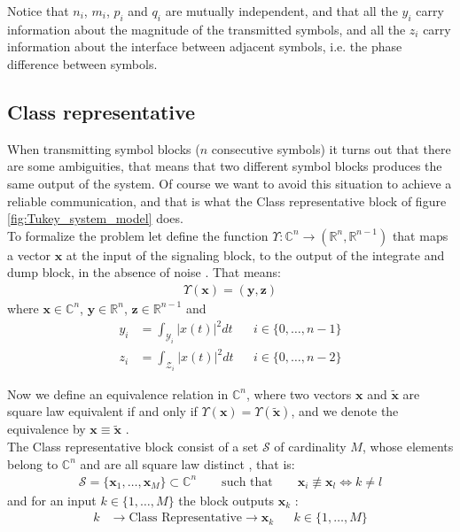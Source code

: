 Notice that $n_i$, $m_i$, $p_i$ and $q_i$ are mutually  independent, and that all the $y_i$ carry information about the magnitude of the transmitted symbols, and all the $z_i$ carry information about the interface between adjacent symbols, i.e. the phase difference between symbols.

\subsection{Class representative}

When transmitting symbol blocks ($n$ consecutive symbols) it turns out that there are some ambiguities, that means that two different symbol blocks produces the same output of the system. Of course we want to avoid this situation to achieve a reliable communication, and that is what the Class representative block of figure \ref{fig:Tukey_system_model} does.\\

To formalize the problem let define the function $\Upsilon: \mathds{C}^n\to(\mathds{R}^n,\mathds{R}^{n-1})$ that maps a vector $\bm x$ at the input of the signaling block, to the output of the integrate and dump block, in the absence of noise \cite{Tasbihi_Tukey}. That means:
\begin{align}
	\Upsilon(\bm x) = (\bm y, \bm z)
\end{align}
where $\bm x\in\mathds{C}^n$, $\bm y\in\mathds{R}^n$, $\bm z\in\mathds{R}^{n-1}$ and 
\begin{align}
	y_i&=\int_{\mathcal Y_i}\bigl|x(t)\bigr|^2dt&&i\in \{0,\dotsc,n-1\}\\
	z_i&=\int_{\mathcal Z_i}\bigl|x(t)\bigr|^2dt&&i\in \{0,\dotsc,n-2\}
\end{align}

Now we define an equivalence relation in $\mathds C^n$, where two vectors $\bm x$ and $\bm{\tilde{x}}$ are square law equivalent if and only if $\Upsilon(\bm x)=\Upsilon(\bm{\tilde{x}})$, and we denote the equivalence by $\bm x \equiv \bm{\tilde{x}}$ \cite{Tasbihi_Tukey}.\\

The Class representative block consist of a set $\mathcal S$ of cardinality $M$, whose elements belong to $\mathds{C}^n$ and are all square law distinct \cite{Tasbihi_Tukey}, that is:
\begin{align}
	\mathcal S = \{\bm x_1, \dotsc,\bm x_M\} \subset\mathds C^n\qquad \text{such that}\qquad\bm x_i\not\equiv\bm x_l \Leftrightarrow k\neq l
\end{align}
and for an input $k\in\{1,\dotsc,M\}$ the block outputs $\bm x_k$ \cite{Tasbihi_Tukey}:
\begin{align}
	k& \longrightarrow\text{Class Representative}\longrightarrow \bm x_k && k\in\{1,\dotsc,M\}
\end{align} 

